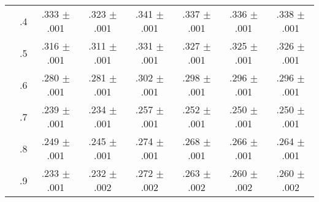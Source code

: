 \begin{tabular}{cccccccc}
 & .4 & .333 $\pm$ .001 & .323 $\pm$ .001 & .341 $\pm$ .001 & .337 $\pm$ .001 & .336 $\pm$ .001 & .338 $\pm$ .001 \\
 & .5 & .316 $\pm$ .001 & .311 $\pm$ .001 & .331 $\pm$ .001 & .327 $\pm$ .001 & .325 $\pm$ .001 & .326 $\pm$ .001 \\
 & .6 & .280 $\pm$ .001 & .281 $\pm$ .001 & .302 $\pm$ .001 & .298 $\pm$ .001 & .296 $\pm$ .001 & .296 $\pm$ .001 \\
 & .7 & .239 $\pm$ .001 & .234 $\pm$ .001 & .257 $\pm$ .001 & .252 $\pm$ .001 & .250 $\pm$ .001 & .250 $\pm$ .001 \\
 & .8 & .249 $\pm$ .001 & .245 $\pm$ .001 & .274 $\pm$ .001 & .268 $\pm$ .001 & .266 $\pm$ .001 & .264 $\pm$ .001 \\
 & .9 & .233 $\pm$ .001 & .232 $\pm$ .002 & .272 $\pm$ .002 & .263 $\pm$ .002 & .260 $\pm$ .002 & .260 $\pm$ .002 \\
\bottomrule
\end{tabular}
